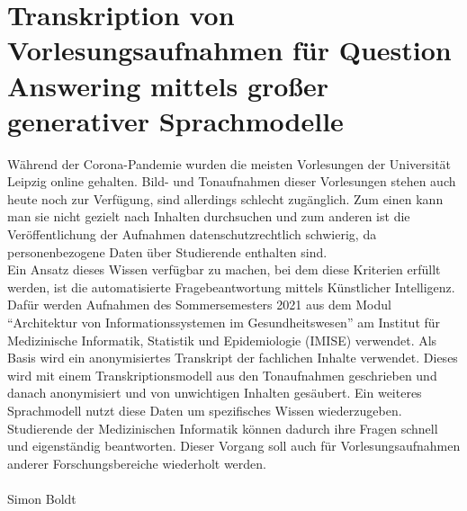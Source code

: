 \documentclass[ngerman,geometry,paper=a4,fontsize=12pt]{scrreprt}
\begin{document}
\thispagestyle{empty}
\onehalfspacing
\section*{Transkription von Vorlesungsaufnahmen für Question Answering mittels großer generativer Sprachmodelle}

Während der Corona-Pandemie wurden die meisten Vorlesungen der Universität Leipzig online gehalten. 
Bild- und Tonaufnahmen dieser Vorlesungen stehen auch heute noch zur Verfügung, sind allerdings schlecht zugänglich. 
Zum einen kann man sie nicht gezielt nach Inhalten durchsuchen und zum anderen ist die Veröffentlichung der Aufnahmen datenschutzrechtlich schwierig, da personenbezogene Daten über Studierende enthalten sind.\\ 
Ein Ansatz dieses Wissen verfügbar zu machen, bei dem diese Kriterien erfüllt werden, ist die automatisierte Fragebeantwortung mittels Künstlicher Intelligenz.
Dafür werden Aufnahmen des Sommersemesters 2021 aus dem Modul \enquote{Architektur von Informationssystemen im Gesundheitswesen} am Institut für Medizinische Informatik, Statistik und Epidemiologie (IMISE) verwendet. 
Als Basis wird ein anonymisiertes Transkript der fachlichen Inhalte verwendet. 
Dieses wird mit einem Transkriptionsmodell aus den Tonaufnahmen geschrieben und danach anonymisiert und von unwichtigen Inhalten gesäubert.
Ein weiteres Sprachmodell nutzt diese Daten um spezifisches Wissen wiederzugeben.
Studierende der Medizinischen Informatik können dadurch ihre Fragen schnell und eigenständig beantworten.
Dieser Vorgang soll auch für Vorlesungsaufnahmen anderer Forschungsbereiche wiederholt werden.\\\\
Simon Boldt


\end{document}
